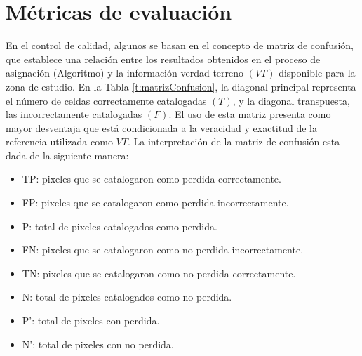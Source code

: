 \section{Métricas de evaluación}
En el control de calidad, algunos se basan en el concepto de matriz de confusi\'on, que establece una relaci\'on entre los resultados obtenidos en el proceso de asignaci\'on (Algoritmo) y la informaci\'on verdad terreno $ (VT) $ disponible para la zona de estudio. En la Tabla \ref{t:matrizConfusion}, la diagonal principal representa el n\'umero de celdas correctamente catalogadas $ (T) $, y la diagonal transpuesta, las incorrectamente catalogadas $ (F) $. El uso de esta matriz presenta como mayor desventaja que est\'a condicionada a la veracidad y exactitud de la referencia utilizada como $ VT $. La interpretaci\'on de la matriz de confusi\'on esta dada de la siguiente manera:
\begin{itemize}
	\item TP: pixeles que se catalogaron como perdida correctamente.
	\item FP: pixeles que se catalogaron como perdida incorrectamente.
	\item P: total de pixeles catalogados como perdida.
	\item FN: pixeles que se catalogaron como no perdida incorrectamente.
	\item TN: pixeles que se catalogaron como no perdida correctamente.
	\item N: total de pixeles catalogados como no perdida.
	\item P': total de pixeles con perdida.
	\item N': total de pixeles con no perdida.
\end{itemize}


